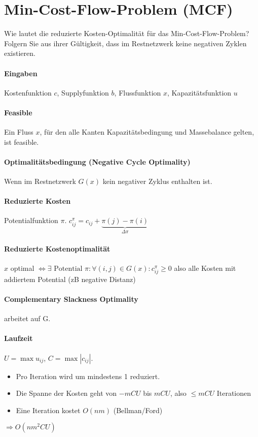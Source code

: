 \newpage
\section{Min-Cost-Flow-Problem (MCF)}
Wie lautet die reduzierte Kosten-Optimalität für das Min-Cost-Flow-Problem? Folgern Sie aus ihrer Gültigkeit, dass im Restnetzwerk keine negativen Zyklen existieren.
\paragraph{Eingaben} Kostenfunktion $c$, Supplyfunktion $b$, Flussfunktion $x$, Kapazitätsfunktion $u$
\paragraph{Feasible} Ein Fluss $x$, für den alle Kanten  Kapazitätsbedingung und  Massebalance gelten, ist feasible.

\paragraph{Optimalitätsbedingung (Negative Cycle Optimality)} Wenn im Restnetzwerk $G(x)$ kein negativer Zyklus enthalten ist.

\paragraph{Reduzierte Kosten} Potentialfunktion $\pi$. $c_{ij}^{\pi} = c_{ij} + \underbrace{\pi(j) - \pi(i)}_{\Delta \pi}$

\paragraph{Reduzierte Kostenoptimalität} $x$ optimal $\Leftrightarrow \exists \text{ Potential } \pi: \forall (i,j) \in G(x) : c_{ij}^{\pi} \geq 0$ also alle Kosten mit addiertem Potential (zB negative Distanz)


\paragraph{Complementary Slackness Optimality} arbeitet auf G.

\paragraph{Laufzeit} $U = \max u_{ij}$, $C = \max |c_{ij}|$. 
\begin{itemize}
 \item Pro Iteration wird um mindestens 1 reduziert. 
 \item Die Spanne der Kosten geht von $-mCU$ bis $mCU$, also $\leq mCU$ Iterationen
 \item Eine Iteration kostet $O(nm)$ (Bellman/Ford)
\end{itemize}
$\Rightarrow O(nm^2 CU )$



